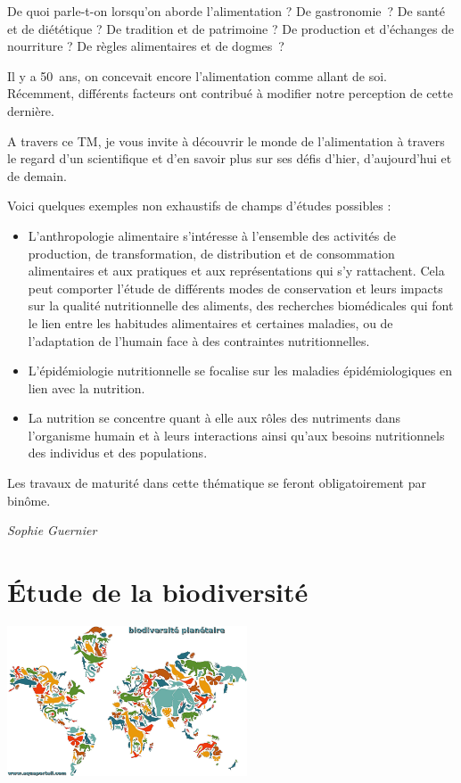 \documentclass[
  10pt,
  french,
  a5paper,
  openany]{book}
\providecommand{\tightlist}{%
  \setlength{\itemsep}{0pt}\setlength{\parskip}{0pt}}
\newenvironment{signature}{\begin{flushright}}{\end{flushright}}
\begin{document}
De quoi parle-t-on lorsqu'on aborde l'alimentation ? De gastronomie~? De santé et de diététique ? De tradition et de patrimoine ? De production et d'échanges de nourriture ? De règles alimentaires et de dogmes~?

Il y a 50~ans, on concevait encore l'alimentation comme allant de soi. Récemment, différents facteurs ont contribué à modifier notre perception de cette dernière.

A travers ce TM, je vous invite à découvrir le monde de l'alimentation à travers le regard d'un scientifique et d'en savoir plus sur ses défis d'hier, d'aujourd'hui et de demain. ~

Voici quelques exemples non exhaustifs de champs d'études possibles :

\begin{itemize}
\tightlist
\item
  L'anthropologie alimentaire s'intéresse à l'ensemble des activités de production, de transformation, de distribution et de consommation alimentaires et aux pratiques et aux représentations qui s'y rattachent. Cela peut comporter l'étude de différents modes de conservation et leurs impacts sur la qualité nutritionnelle des aliments, des recherches biomédicales qui font le lien entre les habitudes alimentaires et certaines maladies, ou de l'adaptation de l'humain face à des contraintes nutritionnelles.
\item
  L'épidémiologie nutritionnelle se focalise sur les maladies épidémiologiques en lien avec la nutrition.
\item
  La nutrition se concentre quant à elle aux rôles des nutriments dans l'organisme humain et à leurs interactions ainsi qu'aux besoins nutritionnels des individus et des populations.
\end{itemize}

Les travaux de maturité dans cette thématique se feront obligatoirement par binôme.

\begin{signature}
\emph{Sophie Guernier}

\end{signature}

\hypertarget{uxe9tude-de-la-biodiversituxe9}{%
\chapter{Étude de la biodiversité}\label{uxe9tude-de-la-biodiversituxe9}}

\begin{center}
\includegraphics[width=\textwidth,height=12em]{images/etude-de-la-biodiversite.png}

\end{center}
\end{document}
